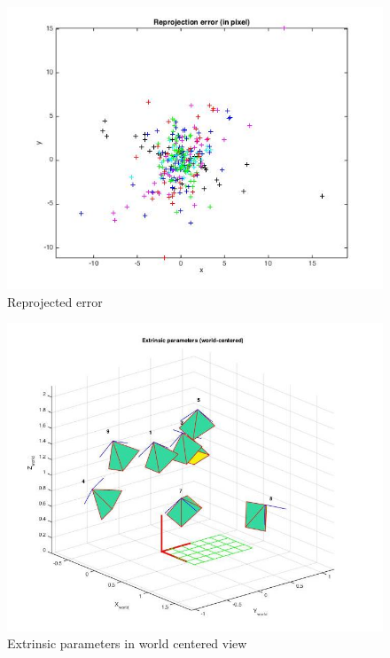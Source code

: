 \documentclass{ethz_report}
\begin{document}
\begin{figure}[H]
\centering
\includegraphics[width=.9\linewidth]{images/reprojection_error}
\caption{Reprojected error}
\end{figure}

\begin{figure}[H]
\centering
\includegraphics[width=.9\linewidth]{images/extrinsic}
\caption{Extrinsic parameters in world centered view}
\end{figure}
\end{document}
